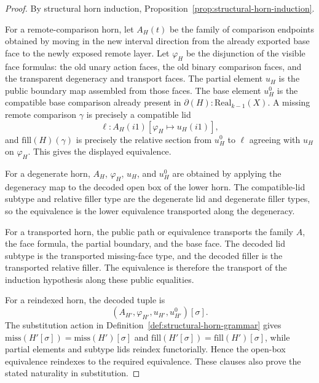 \documentclass{lmcs}
\begin{document}
\begin{proof}
By structural horn induction, Proposition~\ref{prop:structural-horn-induction}.

For a remote-comparison horn, let \(A_H(t)\) be the family of comparison endpoints obtained by
moving in the new interval direction from the already exported base face to the newly exposed
remote layer.  Let \(\varphi_H\) be the disjunction of the visible face formulas: the old
unary action faces, the old binary comparison faces, and the transparent degeneracy and
transport faces.  The partial element \(u_H\) is the public boundary map assembled from those
faces.  The base element \(u^0_H\) is the compatible base comparison already present in
\(\partial(H):\mathrm{Real}_{k-1}(X)\).  A missing remote comparison \(\gamma\) is precisely a
compatible lid
\[
  \ell:A_H(i1)[\varphi_H\mapsto u_H(i1)],
\]
and \(\mathrm{fill}(H)(\gamma)\) is precisely the relative section from \(u^0_H\) to \(\ell\)
agreeing with \(u_H\) on \(\varphi_H\).  This gives the displayed equivalence.

For a degenerate horn, \(A_H\), \(\varphi_H\), \(u_H\), and \(u^0_H\) are obtained by applying
the degeneracy map to the decoded open box of the lower horn.  The compatible-lid subtype and
relative filler type are the degenerate lid and degenerate filler types, so the equivalence is
the lower equivalence transported along the degeneracy.

For a transported horn, the public path or equivalence transports the family \(A\), the face
formula, the partial boundary, and the base face.  The decoded lid subtype is the transported
missing-face type, and the decoded filler is the transported relative filler.  The equivalence
is therefore the transport of the induction hypothesis along these public equalities.

For a reindexed horn, the decoded tuple is
\[
  (A_{H'},\varphi_{H'},u_{H'},u^0_{H'})[\sigma].
\]
The substitution action in Definition~\ref{def:structural-horn-grammar} gives
\(\mathrm{miss}(H'[\sigma])=\mathrm{miss}(H')[\sigma]\) and
\(\mathrm{fill}(H'[\sigma])=\mathrm{fill}(H')[\sigma]\), while partial elements and subtype
lids reindex functorially.  Hence the open-box equivalence reindexes to the required
equivalence.  These clauses also prove the stated naturality in substitution.
\end{proof}
\end{document}
